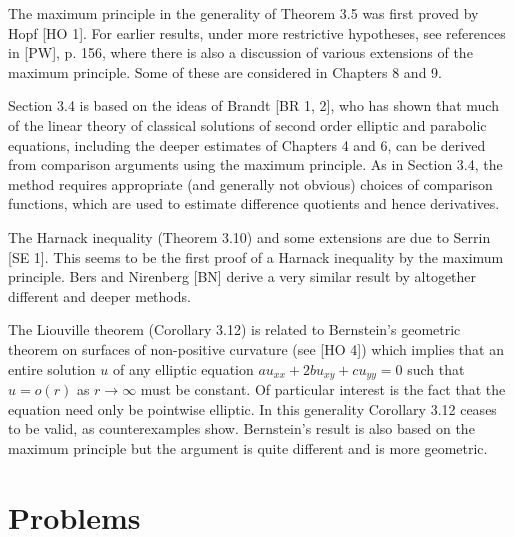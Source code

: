 
The maximum principle in the generality of Theorem 3.5 was first proved by Hopf [HO 1]. For earlier results, under more restrictive hypotheses, see references in [PW], p. 156, where there is also a discussion of various extensions of the maximum principle. Some of these are considered in Chapters 8 and 9.

Section 3.4 is based on the ideas of Brandt [BR 1, 2], who has shown that much of the linear theory of classical solutions of second order elliptic and parabolic equations, including the deeper estimates of Chapters 4 and 6, can be derived from comparison arguments using the maximum principle. As in Section 3.4, the method requires appropriate (and generally not obvious) choices of comparison functions, which are used to estimate difference quotients and hence derivatives.

The Harnack inequality (Theorem 3.10) and some extensions are due to Serrin [SE 1]. This seems to be the first proof of a Harnack inequality by the maximum principle. Bers and Nirenberg [BN] derive a very similar result by altogether different and deeper methods.

The Liouville theorem (Corollary 3.12) is related to Bernstein's geometric theorem on surfaces of non-positive curvature (see [HO 4]) which implies that an entire solution $u$ of any elliptic equation $au_{xx} + 2bu_{xy} + cu_{yy} = 0$ such that $u = o(r)$ as $r \to \infty$ must be constant. Of particular interest is the fact that the equation need only be pointwise elliptic. In this generality Corollary 3.12 ceases to be valid, as counterexamples show. Bernstein's result is also based on the maximum principle but the argument is quite different and is more geometric.

\section*{Problems}

